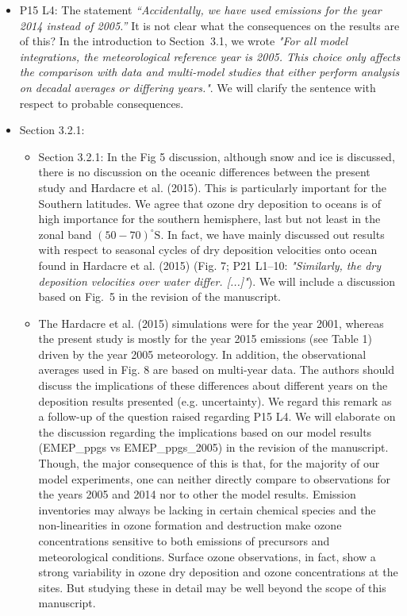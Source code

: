 \begin{itemize}
\item {\color{blue}  P15 L4: The statement \emph{“Accidentally, we have used emissions for the year
  2014 instead of 2005.”} It is not clear what the consequences on the results are of this?}
  In the introduction to Section~3.1, we wrote \emph{"For all model integrations, the meteorological reference year is 2005. This choice only affects the comparison with data and multi-model studies that either perform analysis on decadal averages or differing years."}. We will clarify the sentence with respect to probable consequences.
  \emph{}
  
\item {\color{blue}  Section 3.2.1: }
  \begin{itemize}
  \item {\color{blue}  Section 3.2.1: In the Fig 5 discussion, although snow and ice is discussed, there is
    no discussion on the oceanic differences between the present study and Hardacre et
    al. (2015). This is particularly important for the Southern latitudes.}
    We agree that ozone dry deposition to oceans is of high importance for the southern hemisphere, last but not least in the zonal band $(50-70)^\circ\mathrm{S}$. In fact, we have mainly discussed out results with respect to seasonal cycles of dry deposition velocities onto ocean found in Hardacre et al. (2015) (Fig. 7; P21 L1--10: \emph{"Similarly, the dry deposition velocities over water differ. [...]"}). We will include a discussion based on Fig.~5 in the revision of the manuscript.
    \emph{}
    
  \item {\color{blue}  The Hardacre et al. (2015) simulations were for the year 2001,
    whereas the present study is mostly for the year 2015 emissions (see Table 1) driven
    by the year 2005 meteorology. In addition, the observational averages used in Fig. 8
    are based on multi-year data. The authors should discuss the implications of these
    differences about different years on the deposition results presented (e.g. uncertainty).}
    We regard this remark as a follow-up of the question raised regarding P15 L4.
    We will elaborate on the discussion regarding the implications based on our model results (EMEP\_ppgs vs EMEP\_ppgs\_2005) in the revision of the manuscript. Though, the major consequence of this is that, for the majority of our model experiments, one can neither directly compare to observations for the years 2005 and 2014 nor to other the model results. Emission inventories may always be lacking in certain chemical species and the non-linearities in ozone formation and destruction make ozone concentrations sensitive to both emissions of precursors and meteorological conditions. Surface ozone observations, in fact, show a strong variability in ozone dry deposition and ozone concentrations at the sites. But studying these in detail may be well beyond the scope of this manuscript. 
    \emph{}
  \end{itemize}
  

\end{itemize}
